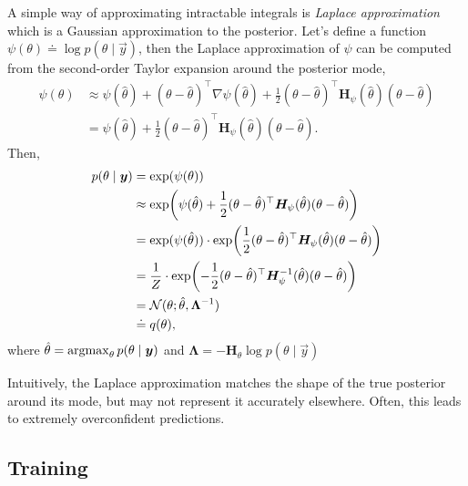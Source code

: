 \begin{example}
  A simple way of approximating intractable integrals is \textit{Laplace
  approximation} which is a Gaussian approximation to the posterior. Let's
  define a function $\psi(\theta)\doteq\log p(\theta\mid \vec{y})$, then the
  Laplace approximation of $\psi$ can be computed from the second-order Taylor
  expansion around the posterior mode,
  \begin{align*}
    \psi(\theta) &\approx \psi(\hat{\theta}) + (\theta - \hat{\theta})^\top \nabla \psi(\hat{\theta}) + \frac{1}{2} (\theta-\hat{\theta})^\top \bm{H}_{\psi}(\hat{\theta}) (\theta - \hat{\theta}) \\
    &= \psi(\hat{\theta}) + \frac{1}{2} (\theta-\hat{\theta})^\top \bm{H}_{\psi}(\hat{\theta}) (\theta - \hat{\theta})
  .\end{align*}
  Then,
  \begin{align*}
    p(\theta\mid\vec{y}) &= \exp(\psi(\theta)) \\
    &\approx \exp\lft(\psi(\hat{\theta}) + \frac{1}{2} (\theta-\hat{\theta})^\top \bm{H}_{\psi}(\hat{\theta}) (\theta - \hat{\theta})\rgt) \\
    &= \exp (\psi(\hat{\theta})) \cdot \exp\lft(\frac{1}{2} (\theta-\hat{\theta})^\top \bm{H}_{\psi}(\hat{\theta}) (\theta - \hat{\theta})\rgt) \\
    &= \frac{1}{Z} \cdot \exp\lft(-\frac{1}{2} (\theta-\hat{\theta})^\top \bm{H}^{-1}_{\psi}(\hat{\theta}) (\theta - \hat{\theta})\rgt) \\
    &= \mathcal{N}(\theta ; \hat{\theta}, \bm{\Lambda}^{-1}) \\
    &\doteq q(\theta)
  ,\end{align*}
  where $\hat{\theta}=\operatorname*{argmax}_{\theta} p(\theta\mid\bm{y})$ and $\bm{\Lambda} =
  -\bm{H}_{\theta} \log p(\theta\mid\vec{y})$

  \vspace{1em}

  Intuitively, the Laplace approximation matches the shape of the true
  posterior around its mode, but may not represent it accurately elsewhere.
  Often, this leads to extremely overconfident predictions.
\end{example}

\subsection{Training}

